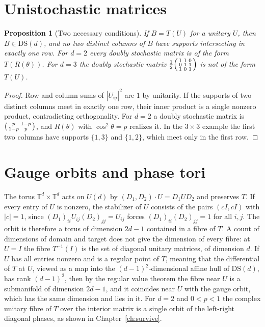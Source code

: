 \documentclass[11pt,oneside]{book}
\newtheorem{proposition}[theorem]{Proposition}
\theoremstyle{definition}
\theoremstyle{remark}
\begin{document}
\section*{Unistochastic matrices}

\begin{proposition}[Two necessary conditions]\label{prop:app-uni}
If $B=T(U)$ for a unitary $U$, then $B\in\mathrm{DS}(d)$, and no two distinct columns of $B$ have supports intersecting in exactly one row. For $d=2$ every doubly stochastic matrix is of the form $T(R(\theta))$. For $d=3$ the doubly stochastic matrix $\tfrac12\begin{psmallmatrix}1&1&0\\0&1&1\\1&0&1\end{psmallmatrix}$ is not of the form $T(U)$.
\end{proposition}

\begin{proof}
Row and column sums of $|U_{ij}|^2$ are $1$ by unitarity. If the supports of two distinct columns meet in exactly one row, their inner product is a single nonzero product, contradicting orthogonality. For $d=2$ a doubly stochastic matrix is $\begin{psmallmatrix}p&1-p\\1-p&p\end{psmallmatrix}$, and $R(\theta)$ with $\cos^2\theta=p$ realizes it. In the $3\times3$ example the first two columns have supports $\{1,3\}$ and $\{1,2\}$, which meet only in the first row.
\end{proof}

\section*{Gauge orbits and phase tori}

The torus $\mathbb T^d\times\mathbb T^d$ acts on $U(d)$ by $(D_1,D_2)\cdot U=D_1UD_2$ and preserves $T$. If every entry of $U$ is nonzero, the stabilizer of $U$ consists of the pairs $(cI,\bar cI)$ with $|c|=1$, since $(D_1)_{ii}U_{ij}(D_2)_{jj}=U_{ij}$ forces $(D_1)_{ii}(D_2)_{jj}=1$ for all $i,j$. The orbit is therefore a torus of dimension $2d-1$ contained in a fibre of $T$. A count of dimensions of domain and target does not give the dimension of every fibre: at $U=I$ the fibre $T^{-1}(I)$ is the set of diagonal unitary matrices, of dimension $d$. If $U$ has all entries nonzero and is a regular point of $T$, meaning that the differential of $T$ at $U$, viewed as a map into the $(d-1)^2$-dimensional affine hull of $\mathrm{DS}(d)$, has rank $(d-1)^2$, then by the regular value theorem the fibre near $U$ is a submanifold of dimension $2d-1$, and it coincides near $U$ with the gauge orbit, which has the same dimension and lies in it. For $d=2$ and $0<p<1$ the complex unitary fibre of $T$ over the interior matrix is a single orbit of the left-right diagonal phases, as shown in Chapter~\ref{ch:survive}.
\end{document}
